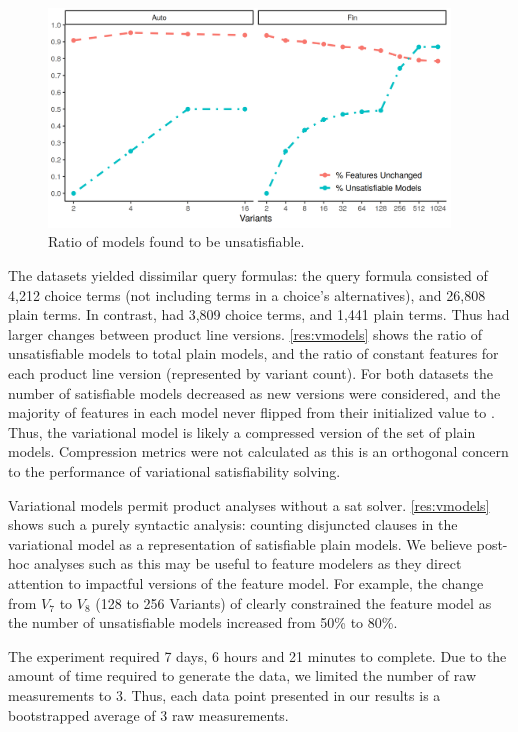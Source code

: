\label{section:case-studies:results-and-discussion}
%
\begin{figure}
  \includegraphics[width=0.95\textwidth]{Plots/VModel}
  \caption{Ratio of models found to be unsatisfiable.}%
  \label{res:vmodels}
\end{figure}
%
The datasets yielded dissimilar query formulas: the \auto{} query formula
consisted of 4,212 choice terms (not including terms in a choice's
alternatives), and 26,808 plain terms. In contrast, \fin{} had 3,809 choice
terms, and 1,441 plain terms. Thus \fin{} had larger changes between product
line versions. \autoref{res:vmodels} shows the ratio of unsatisfiable models to
total plain models, and the ratio of constant features for each product line
version (represented by variant count). For both datasets the number of
satisfiable models decreased as new versions were considered, and the majority
of features in each model never flipped from their initialized value \fls{} to
\tru{}. Thus, the variational model is likely a compressed version of the set
of plain models. Compression metrics were not calculated as this is an
orthogonal concern to the performance of variational satisfiability solving.

Variational models permit product analyses without a \ac{sat} solver.
\autoref{res:vmodels} shows such a purely syntactic analysis: counting
disjuncted clauses in the variational model as a representation of satisfiable
plain models. We believe post-hoc analyses such as this may be useful to feature
modelers as they direct attention to impactful versions of the feature model.
For example, the change from $V_{7}$ to $V_{8}$ (128 to 256 Variants) of \fin{}
clearly constrained the feature model as the number of unsatisfiable models
increased from 50\% to 80\%.

The experiment required 7 days, 6 hours and 21 minutes to complete. Due to the
amount of time required to generate the data, we limited the number of raw
measurements to 3. Thus, each data point presented in our results is a
bootstrapped average of 3 raw measurements.

